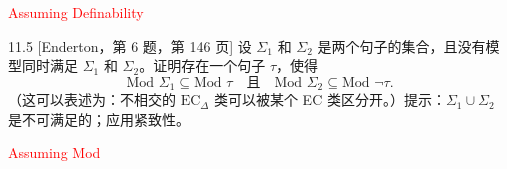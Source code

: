 \textcolor{red}{
  Assuming Definability
}

\begin{exercise}{11.5}
  [Enderton，第 6 题，第 146 页]
  设 $\Sigma_1$ 和 $\Sigma_2$ 是两个句子的集合，且没有模型同时满足 $\Sigma_1$ 和 $\Sigma_2$。证明存在一个句子 $\tau$，使得
  \[
    \text{Mod } \Sigma_1 \subseteq \text{Mod } \tau \quad \text{且} \quad \text{Mod } \Sigma_2 \subseteq \text{Mod } \lnot \tau.
  \]
  （这可以表述为：不相交的 $\text{EC}_\Delta$ 类可以被某个 EC 类区分开。）提示：$\Sigma_1 \cup \Sigma_2$ 是不可满足的；应用紧致性。
\end{exercise}

\textcolor{red}{Assuming Mod}
